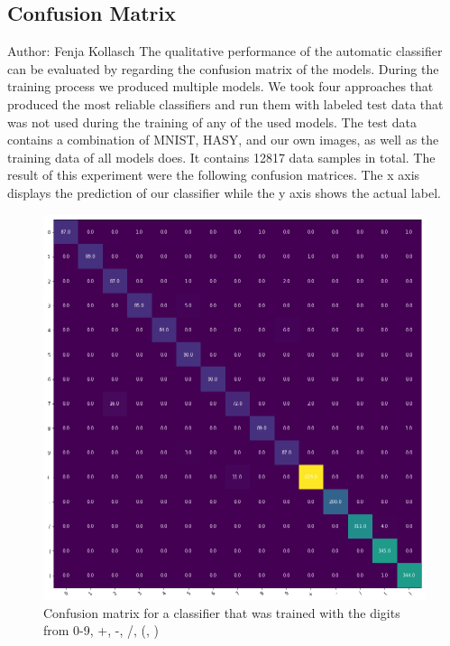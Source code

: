 \documentclass[11pt]{article}
\begin{document}
	
	
	
	
	
	\subsection{Confusion Matrix}
	\small{Author: Fenja Kollasch} \newline \newline
	The qualitative performance of the automatic classifier can be evaluated by regarding the confusion matrix of the models. During the training process we produced multiple models. We took four approaches that produced the most reliable classifiers and run them with labeled test data that was not used during the training of any of the used models. The test data contains a combination of MNIST, HASY, and our own images, as well as the training data of all models does. It contains 12817 data samples in total. The result of this experiment were the following confusion matrices. The x axis displays the prediction of our classifier while the y axis shows the actual label.
	
	\begin{figure}[H]
		\includegraphics[width=\textwidth]{ImagesForReport/confusion_matrix_all.png}
		\caption{Confusion matrix for a classifier that was trained with the digits from 0-9, +, -, /, (, )}
		\label{fig:mat-all}
	\end{figure}
	
\end{document}
